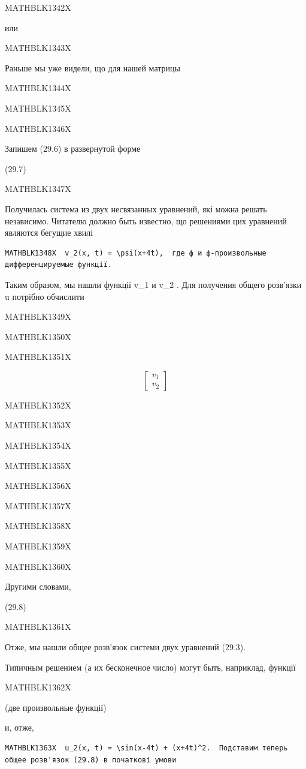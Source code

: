 \documentclass[
  ukrainian,
]{article}
\begin{document}
MATHBLK1342X

или

MATHBLK1343X

Раньше мы уже видели, що для нашей матрицы

MATHBLK1344X

MATHBLK1345X

MATHBLK1346X

Запишем (29.6) в развернутой форме

(29.7)

MATHBLK1347X

Получилась система из двух несвязанных уравнений, які можна решать
независимо. Читателю должно быть известно, що решениями цих уравнений
являются бегущие хвилі

\begin{verbatim}
MATHBLK1348X  v_2(x, t) = \psi(x+4t),  где ф и ф-произвольные дифференцируемые функції.
\end{verbatim}

Таким образом, мы нашли функції v\_1 и v\_2 . Для получения общего
розв'язки u потрібно обчислити

MATHBLK1349X

MATHBLK1350X

MATHBLK1351X

\[
\begin{bmatrix} v_1 \\ v_2 \end{bmatrix}
\]

MATHBLK1352X

MATHBLK1353X

MATHBLK1354X

MATHBLK1355X

MATHBLK1356X

MATHBLK1357X

MATHBLK1358X

MATHBLK1359X

MATHBLK1360X

Другими словами,

(29.8)

MATHBLK1361X

Отже, мы нашли общее розв'язок системи двух уравнений (29.3).

Типичным решением (а их бесконечное число) могут быть, наприклад,
функції

MATHBLK1362X

(две произвольные функції)

и, отже,

\begin{verbatim}
MATHBLK1363X  u_2(x, t) = \sin(x-4t) + (x+4t)^2.  Подставим теперь общее розв'язок (29.8) в початкові умови
\end{verbatim}
\end{document}
